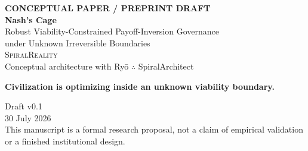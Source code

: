 \documentclass[11pt,a4paper]{article}
\numberwithin{equation}{section}
\theoremstyle{definition}
\theoremstyle{plain}
\theoremstyle{remark}
\begin{document}
\hypersetup{pageanchor=false}
\begin{titlepage}
\thispagestyle{empty}
\centering
\vspace*{1.6cm}
{\small\bfseries\color{Moss}\MakeUppercase{Conceptual Paper / Preprint Draft}}\\[1.1cm]
{\fontsize{31}{36}\selectfont\bfseries\color{Forest} Nash's Cage}\\[0.55cm]
{\fontsize{17}{22}\selectfont\color{Earth}
Robust Viability-Constrained Payoff-Inversion Governance\\
under Unknown Irreversible Boundaries}\\[1.6cm]

{\Large\textsc{SpiralReality}}\\[0.35cm]
{\large Conceptual architecture with Ry\={o} $\therefore$ SpiralArchitect}\\[1.5cm]

\begin{tcolorbox}[width=0.84\textwidth,colback=Mist,colframe=Forest,boxrule=0.8pt]
\centering\large\bfseries
Civilization is optimizing inside an unknown viability boundary.
\end{tcolorbox}

\vfill
{\large Draft v0.1}\\[0.2cm]
{\large 30 July 2026}\\[1cm]
{\small This manuscript is a formal research proposal, not a claim of empirical validation or a finished institutional design.}
\end{titlepage}
\hypersetup{pageanchor=true}
\setcounter{page}{1}
\end{document}

